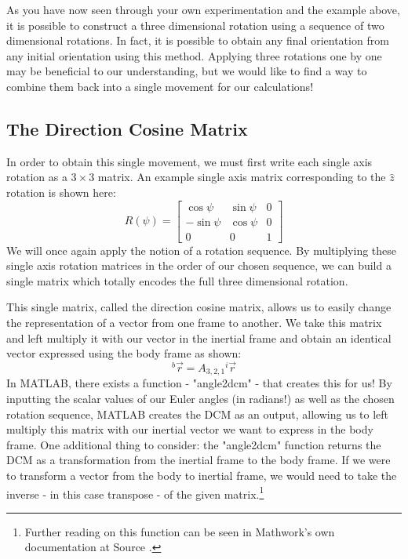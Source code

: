 \documentclass[10pt, openany, titlepage]{book}
\theoremstyle{definition}
\newcounter{example}[chapter]
\begin{document}
As you have now seen through your own experimentation and the example above, it is possible to construct a three dimensional rotation using a sequence of two dimensional rotations. In fact, it is possible to obtain any final orientation from any initial orientation using this method. Applying three rotations one by one may be beneficial to our understanding, but we would like to find a way to combine them back into a single movement for our calculations!

\subsection{The Direction Cosine Matrix}\label{sec:TheDCM}

In order to obtain this single movement, we must first write each single axis rotation as a $3\times 3$ matrix. An example single axis matrix corresponding to the $\hat{z}$ rotation is shown here:
$$R(\psi)=\begin{bmatrix}
\cos\psi&\sin\psi&0\\
-\sin\psi&\cos\psi&0\\0&0&1
\end{bmatrix}$$
We will once again apply the notion of a rotation sequence. By multiplying these single axis rotation matrices in the order of our chosen sequence, we can build a single matrix which totally encodes the full three dimensional rotation.

This single matrix, called the direction cosine matrix, allows us to easily change the representation of a vector from one frame to another. We take this matrix and left multiply it with our vector in the \gls{inertial frame} and obtain an identical vector expressed using the \gls{body frame} as shown:
\begin{equation}
    ^b\vec{r}=A_{3,2,1} {^i}\vec{r}
\end{equation}
In MATLAB, there exists a function - "angle2dcm" - that creates this for us! By inputting the scalar values of our \gls{Euler angles} (in radians!) as well as the chosen rotation sequence, MATLAB creates the DCM as an output, allowing us to left multiply this matrix with our inertial vector we want to express in the \gls{body frame}. One additional thing to consider: the "angle2dcm" function returns the DCM as a transformation from the \gls{inertial frame} to the \gls{body frame}. If we were to transform a vector from the body to \gls{inertial frame}, we would need to take the inverse - in this case transpose - of the given matrix.\footnote{Further reading on this function can be seen in Mathwork's own documentation at Source \cite{mathworks_eul2quat_nodate}.}
\end{document}
